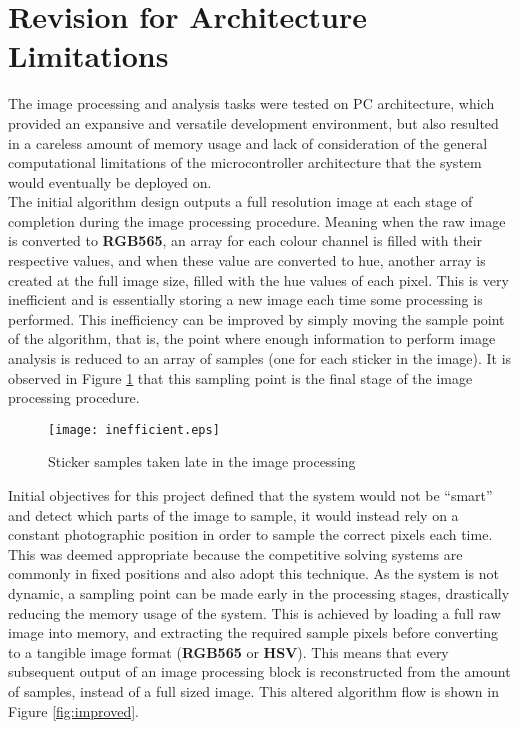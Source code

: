 \documentclass[11pt, a4paper, oneside]{Thesis} %
\begin{document}

\section{Revision for Architecture Limitations}\label{sec:revision_arch}
The image processing and analysis tasks were tested on PC architecture, which provided an expansive and versatile development environment, but also resulted in a careless amount of memory usage and lack of consideration of the general computational limitations of the microcontroller architecture that the system would eventually be deployed on.\\

The initial algorithm design outputs a full resolution image at each stage of completion during the image processing procedure. Meaning when the raw image is converted to \textbf{RGB565}, an array for each colour channel is filled with their respective values, and when these value are converted to hue, another array is created at the full image size, filled with the hue values of each pixel. This is very inefficient and is essentially storing a new image each time some processing is performed. This inefficiency can be improved by simply moving the sample point of the algorithm, that is, the point where enough information to perform image analysis is reduced to an array of samples (one for each sticker in the image). It is observed in Figure \ref{fig:inefficient} that this sampling point is the final stage of the image processing procedure.

\begin{figure}[h]
  \begin{center}
    \texttt{[image: inefficient.eps]}
  \end{center}
  \caption{Sticker samples taken late in the image processing}
  \label{fig:inefficient}
\end{figure}

Initial objectives for this project defined that the system would not be ``smart'' and detect which parts of the image to sample, it would instead rely on a constant photographic position in order to sample the correct pixels each time. This was deemed appropriate because the competitive solving systems are commonly in fixed positions and also adopt this technique. As the system is not dynamic, a sampling point can be made early in the processing stages, drastically reducing the memory usage of the system. This is achieved by loading a full raw image into memory, and extracting the required sample pixels before converting to a tangible image format (\textbf{RGB565} or \textbf{HSV}). This means that every subsequent output of an image processing block is reconstructed from the amount of samples, instead of a full sized image. This altered algorithm flow is shown in Figure \ref{fig:improved}. 
\end{document}
